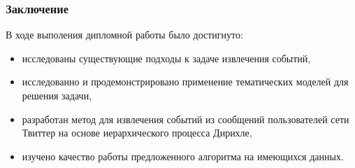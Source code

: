\documentclass[10pt,pdf,hyperref={unicode}]{beamer}
\begin{document}
\begin{frame}
  \frametitle{Заключение}
  В ходе выполения дипломной работы было достигнуто:
	\begin{itemize}
	 \item исследованы существующие подходы к задаче извлечения событий,
	 \item исследованно и продемонстрировано применение тематических моделей для решения задачи,
	 \item разработан метод для извлечения событий из сообщений пользователей сети Твиттер на основе иерархического процесса Дирихле,
	 \item изучено качество работы предложенного алгоритма на имеющихся данных.
	\end{itemize}
\end{frame}
\end{document}
